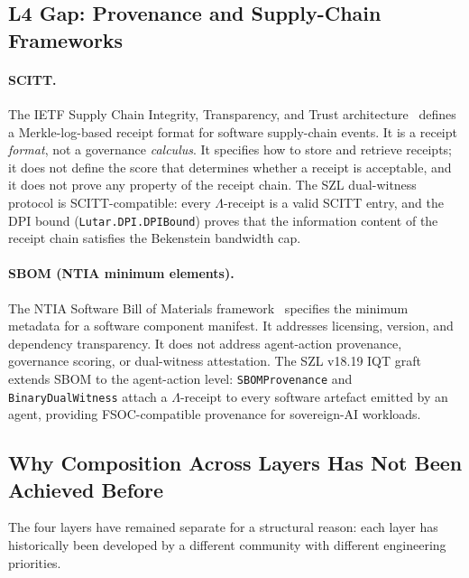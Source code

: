 \subsection{L4 Gap: Provenance and Supply-Chain Frameworks}
\label{ssec:l4gap}

\paragraph{SCITT.}
The IETF Supply Chain Integrity, Transparency, and Trust
architecture~\cite{ietf2024scitt} defines a Merkle-log-based receipt
format for software supply-chain events.
It is a receipt \emph{format}, not a governance \emph{calculus}.
It specifies how to store and retrieve receipts; it does not define the
score that determines whether a receipt is acceptable, and it does not
prove any property of the receipt chain.
The SZL dual-witness protocol is SCITT-compatible: every
\(\Lambda\)-receipt is a valid SCITT entry, and the DPI bound
(\texttt{Lutar.DPI.DPIBound}) proves that the information content of the
receipt chain satisfies the Bekenstein bandwidth cap.

\paragraph{SBOM (NTIA minimum elements).}
The NTIA Software Bill of Materials framework~\cite{ntia2021sbom} specifies
the minimum metadata for a software component manifest.
It addresses licensing, version, and dependency transparency.
It does not address agent-action provenance, governance scoring, or
dual-witness attestation.
The SZL v18.19 IQT graft extends SBOM to the agent-action level:
\texttt{SBOMProvenance} and \texttt{BinaryDualWitness} attach a
\(\Lambda\)-receipt to every software artefact emitted by an agent,
providing FSOC-compatible provenance for sovereign-AI workloads.

\subsection{Why Composition Across Layers Has Not Been Achieved Before}
\label{ssec:whyfirst}

The four layers have remained separate for a structural reason: each
layer has historically been developed by a different community with
different engineering priorities.


